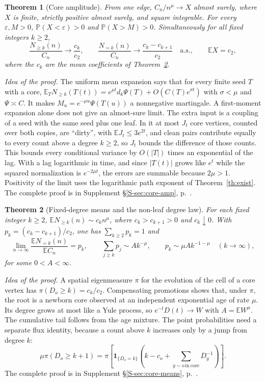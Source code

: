 \documentclass[11pt]{article}
\newtheorem{theorem}{Theorem}
\newcommand{\resulttag}{?}
\newcommand{\tagnext}[1]{\renewcommand{\resulttag}{#1}}
\theoremstyle{remark}
\newcommand{\E}{\mathbb E}
\newcommand{\Sref}[1]{Supplement \S\ref{S-#1}, p.~\pageref{S-#1}}
\begin{document}
\tagnext{AMP}
\begin{theorem}[Core amplitude]\label{th:core-amplitude}
From one edge, $C_n/n^\mu\to X$ almost surely, where $X$ is finite, strictly positive almost surely, and square integrable. For every $\varepsilon,M>0$, $\mathbb P(X<\varepsilon)>0$ and $\mathbb P(X>M)>0$. Simultaneously for all fixed integers $k\ge2$,
\[
 \frac{N_{\ge k}(n)}{C_n}\longrightarrow\frac{c_k}{c_2},\qquad
 \frac{N_{=k}(n)}{C_n}\longrightarrow\frac{c_k-c_{k+1}}{c_2}
 \quad\text{a.s.},\qquad \mathbb E X=c_2,
\]
where the $c_k$ are the mean coefficients of Theorem~\ref{th:core-means}.
\end{theorem}
\emph{Idea of the proof.} The uniform mean expansion says that for every finite seed $T$ with a core, $\E_TN_{\ge k}(T(t))=e^{\mu t}d_k\Psi(T)+O(C(T)e^{\sigma t})$ with $\sigma<\mu$ and $\Psi\asymp C$. It makes $M_u=e^{-\mu u}\Psi(T(u))$ a nonnegative martingale. A first-moment expansion alone does not give an almost-sure limit. The extra input is a coupling of a seed with the same seed plus one leaf. In it at most $J_t$ core vertices, counted over both copies, are ``dirty'', with $\E J_t\le3e^{2t}$, and clean pairs contribute equally to every count above a degree $k\ge2$, so $J_t$ bounds the difference of those counts. This bounds every conditional variance by $O(|T|)$ times an exponential of the lag. With a lag logarithmic in time, and since $|T(t)|$ grows like $e^t$ while the squared normalization is $e^{-2\mu t}$, the errors are summable because $2\mu>1$. Positivity of the limit uses the logarithmic path exponent of Theorem~\ref{th:exist}. The complete proof is in \Sref{sec:core-amp}.

\tagnext{DEG}
\begin{theorem}[Fixed-degree means and the non-leaf degree law]\label{th:core-means}
For each fixed integer $k\ge2$, $\mathbb E N_{\ge k}(n)\sim c_k n^\mu$, where $c_k>c_{k+1}>0$ and $c_k\downarrow0$. With $p_k=(c_k-c_{k+1})/c_2$, one has $\sum_{k\ge2}p_k=1$ and
\[
 \lim_{n\to\infty}\frac{\mathbb E N_{=k}(n)}{\mathbb E C_n}=p_k,
 \qquad \sum_{j\ge k}p_j\sim A k^{-\mu},\qquad p_k\sim\mu A k^{-1-\mu}
 \quad(k\to\infty),
\]
for some $0<A<\infty$.
\end{theorem}
\emph{Idea of the proof.} A spatial eigenmeasure $\pi$ for the evolution of the cell of a core vertex has $\pi(D_o\ge k)=c_k/c_2$. Compensating promotions shows that, under $\pi$, the root is a newborn core observed at an independent exponential age of rate $\mu$. Its degree grows at most like a Yule process, so $e^{-t}D(t)\to W$ with $A=\E W^\mu$. The cumulative tail follows from the age mixture. The point probabilities need a separate flux identity, because a count above $k$ increases only by a jump from degree $k$:
\[
 \mu\pi(D_o\ge k+1)
 =\pi\left[\mathbf1_{\{D_o=k\}}\left(k-c_o+\sum_{y\sim o\,\mathrm{in\ core}}D_y^{-1}\right)\right].
\]
The complete proof is in \Sref{sec:core-means}.
\end{document}
